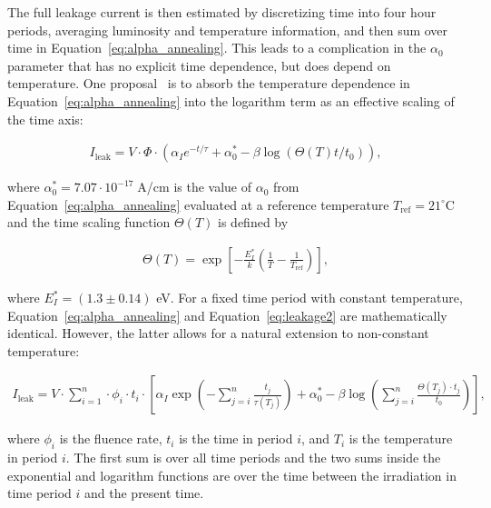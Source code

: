 The full leakage current is then estimated by discretizing time into four hour periods, averaging luminosity and temperature information, and then sum over time in Equation~\ref{eq:alpha_annealing}.  This leads to a complication in the $\alpha_0$ parameter that has no explicit time dependence, but does depend on temperature.  One proposal~\cite{moll-thesis} is to absorb the temperature dependence in Equation~\ref{eq:alpha_annealing} into the logarithm term as an effective scaling of the time axis:

\begin{align}
\label{eq:leakage2}
I_\text{leak}=V\cdot\Phi\cdot\left(\alpha_Ie^{-t/\tau}+\alpha_0^*-\beta\log(\Theta(T)t/t_0)\right),
\end{align}

\noindent where $\alpha_0^*=7.07\cdot 10^{-17}\;$A/cm is the value of $\alpha_0$ from Equation~\ref{eq:alpha_annealing} evaluated at a reference temperature $T_\text{ref}=21^{\circ}$C and the time scaling function $\Theta(T)$ is defined by

\begin{align}
\label{eq:tempscaling}
\Theta(T) = \exp \left[ - \frac{E_I^*}{k } \left( \frac{1}{T} - \frac{1}{T_\text{ref} } \right) \right],
\end{align}

where $E_I^*=(1.3\pm 0.14)$ eV.  For a fixed time period with constant temperature, Equation~\ref{eq:alpha_annealing} and Equation~\ref{eq:leakage2} are mathematically identical.  However, the latter allows for a natural extension to non-constant temperature:

\begin{align}
\label{eq:leakage_modified}
I_\text{leak}=V\cdot\sum_{i=1}^n\cdot\phi_i\cdot t_i\cdot\left[\alpha_I\exp\left(-\sum_{j=i}^n\frac{t_j}{\tau(T_j)}\right)+\alpha_0^*-\beta\log\left(\sum_{j=i}^n\frac{\Theta(T_j)\cdot t_j }{ t_0}\right)\right],
\end{align}

where $\phi_i$ is the fluence rate, $t_i$ is the time in period $i$, and $T_i$ is the temperature in period $i$.  The first sum is over all time periods and the two sums inside the exponential and logarithm functions are over the time between the irradiation in time period $i$ and the present time.

